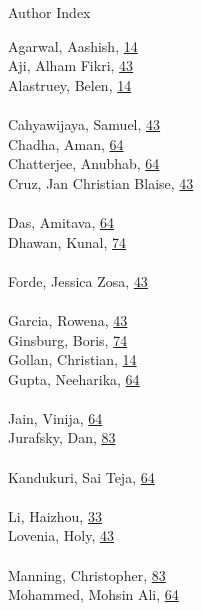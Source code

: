 \documentclass[11pt,oneside]{book}
\begin{document}
\begin{huge}
Author Index
\end{huge}
\vspace*{1em}
\begin{multicols}{2}
Agarwal, Aashish, \hyperlink{page.14}{14}\\
Aji, Alham Fikri, \hyperlink{page.43}{43}\\
Alastruey, Belen, \hyperlink{page.14}{14}\\
\\ %
Cahyawijaya, Samuel, \hyperlink{page.43}{43}\\
Chadha, Aman, \hyperlink{page.64}{64}\\
Chatterjee, Anubhab, \hyperlink{page.64}{64}\\
Cruz, Jan Christian Blaise, \hyperlink{page.43}{43}\\
\\ %
Das, Amitava, \hyperlink{page.64}{64}\\
Dhawan, Kunal, \hyperlink{page.74}{74}\\
\\ %
Forde, Jessica Zosa, \hyperlink{page.43}{43}\\
\\ %
Garcia, Rowena, \hyperlink{page.43}{43}\\
Ginsburg, Boris, \hyperlink{page.74}{74}\\
Gollan, Christian, \hyperlink{page.14}{14}\\
Gupta, Neeharika, \hyperlink{page.64}{64}\\
\\ %
Jain, Vinija, \hyperlink{page.64}{64}\\
Jurafsky, Dan, \hyperlink{page.83}{83}\\
\\ %
Kandukuri, Sai Teja, \hyperlink{page.64}{64}\\
\\ %
Li, Haizhou, \hyperlink{page.33}{33}\\
Lovenia, Holy, \hyperlink{page.43}{43}\\
\\ %
Manning, Christopher, \hyperlink{page.83}{83}\\
Mohammed, Mohsin Ali, \hyperlink{page.64}{64}\\

\end{multicols}
\end{document}
